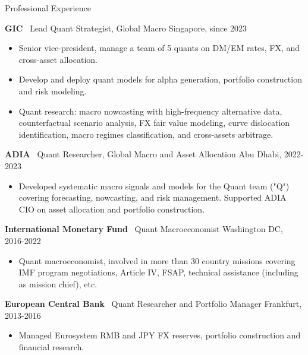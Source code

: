 \documentclass[usegeometry, 10pt, a4paper]{cv} %
\newcommand{\activite}[1]{\textbf{#1}\ }
\begin{document}
\begin{rubriquetableau}[0.95\textwidth]{Professional Experience}\\
\vspace{-0.5cm}

\activite{GIC} Lead Quant Strategist, Global Macro \hfill
Singapore, since 2023 \\ \vspace{-0.4cm}
\begin{itemize}
  \item Senior vice-president, manage a team of 5 quants on DM/EM rates, FX, and cross-asset allocation.
  \item Develop and deploy quant models for alpha generation, portfolio construction and risk modeling.
  \item Quant research: macro nowcasting with high-frequency alternative data, counterfactual scenario analysis, FX fair value modeling, curve dislocation identification, macro regimes classification, and cross-assets arbitrage.
\end{itemize} 

\vspace{0.4cm}

\activite{ADIA} Quant Researcher, Global Macro and Asset Allocation  \hfill
Abu Dhabi, 2022-2023 \\ \vspace{-0.2cm}
\begin{itemize}[]
\item Developed systematic macro signals and models for the Quant team ("Q") covering forecasting, nowcasting, and risk management. Supported ADIA CIO on asset allocation and portfolio construction.
 \end{itemize}
 
\vspace{0.4cm}

\activite{International Monetary Fund} Quant Macroeconomist \hfill Washington DC, 2016-2022 \\
\vspace{-0.2cm}

\begin{itemize}[]
  \item Quant macroeconomist, involved in more than 30 country missions covering IMF program negotiations, Article IV, FSAP, technical assistance (including as mission chief), etc.
  \end{itemize}
 
\vspace{0.4cm}

\activite{European Central Bank} Quant Researcher and Portfolio Manager \hfill Frankfurt, 2013-2016 \\
\vspace{-0.2cm}

\begin{itemize}[]
  \item Managed Eurosystem RMB and JPY FX reserves, portfolio construction and financial research.
\end{itemize}
\end{rubriquetableau}
\end{document}
